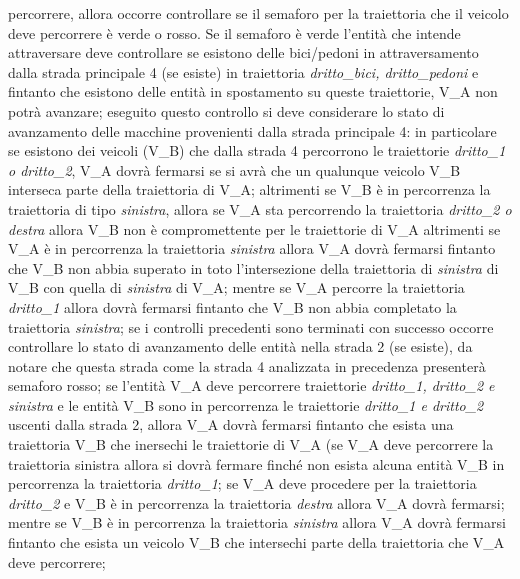 \begin{enumerate}
\begin{enumerate}
\begin{itemize}
percorrere, allora occorre controllare se il semaforo per la traiettoria che il veicolo deve percorrere è verde o rosso. Se il semaforo è verde l'entità che intende attraversare deve controllare se esistono delle bici/pedoni in attraversamento dalla strada principale 4 (se esiste) in traiettoria \textit{drit\-to\_bi\-ci, drit\-to\_pe\-do\-ni} e fintanto che esistono delle entità in spostamento su queste traiettorie, V\_A non potrà avanzare; eseguito questo controllo si deve considerare lo stato di avanzamento delle macchine provenienti dalla strada principale 4: in particolare se esistono dei veicoli (V\_B) che dalla strada 4 percorrono le traiettorie \textit{dritto\_1 o dritto\_2}, V\_A dovrà fermarsi se si avrà che un qualunque veicolo V\_B interseca parte della traiettoria di V\_A; altrimenti se V\_B è in percorrenza la traiettoria di tipo \textit{sinistra}, allora se V\_A sta percorrendo la traiettoria \textit{dritto\_2 o destra} allora V\_B non è compromettente per le traiettorie di V\_A altrimenti se V\_A è in percorrenza la traiettoria \textit{sinistra} allora V\_A dovrà fermarsi fintanto che V\_B non abbia superato in toto l'intersezione della traiettoria di \textit{sinistra} di V\_B con quella di \textit{sinistra} di V\_A; mentre se V\_A percorre la traiettoria \textit{dritto\_1} allora dovrà fermarsi fintanto che V\_B non abbia completato la traiettoria \textit{sinistra}; se i controlli precedenti sono terminati con successo occorre controllare lo stato di avanzamento delle entità nella strada 2 (se esiste), da notare che questa strada come la strada 4 analizzata in precedenza presenterà semaforo rosso; se l'entità V\_A deve percorrere traiettorie \textit{dritto\_1, dritto\_2 e sinistra} e le entità V\_B sono in percorrenza le traiettorie \textit{dritto\_1 e dritto\_2} uscenti dalla strada 2, allora V\_A dovrà fermarsi fintanto che esista una traiettoria V\_B  che inersechi le traiettorie di V\_A (se V\_A deve percorrere la traiettoria sinistra allora si dovrà fermare finché non esista alcuna entità V\_B in percorrenza la traiettoria \textit{dritto\_1}; se V\_A deve procedere per la traiettoria \textit{dritto\_2} e V\_B è in percorrenza la traiettoria \textit{destra} allora V\_A dovrà fermarsi; mentre se V\_B è in percorrenza la traiettoria \textit{sinistra} allora V\_A dovrà fermarsi fintanto che esista un veicolo V\_B che intersechi parte della traiettoria che V\_A deve percorrere;

\end{itemize}
\end{enumerate}
\end{enumerate}
